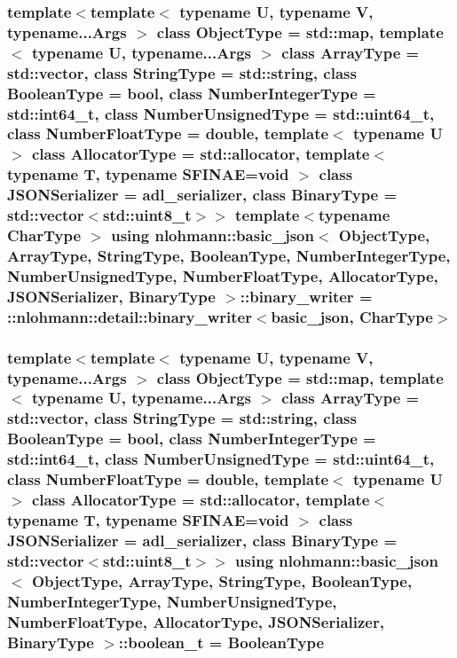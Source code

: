 \subsubsection[{\texorpdfstring{binary\+\_\+writer}{binary_writer}}]{\setlength{\rightskip}{0pt plus 5cm}template$<$template$<$ typename U, typename V, typename...\+Args $>$ class Object\+Type = std\+::map, template$<$ typename U, typename...\+Args $>$ class Array\+Type = std\+::vector, class String\+Type  = std\+::string, class Boolean\+Type  = bool, class Number\+Integer\+Type  = std\+::int64\+\_\+t, class Number\+Unsigned\+Type  = std\+::uint64\+\_\+t, class Number\+Float\+Type  = double, template$<$ typename U $>$ class Allocator\+Type = std\+::allocator, template$<$ typename T, typename S\+F\+I\+N\+A\+E=void $>$ class J\+S\+O\+N\+Serializer = adl\+\_\+serializer, class Binary\+Type  = std\+::vector$<$std\+::uint8\+\_\+t$>$$>$ template$<$typename Char\+Type $>$ using {\bf nlohmann\+::basic\+\_\+json}$<$ Object\+Type, Array\+Type, String\+Type, Boolean\+Type, Number\+Integer\+Type, Number\+Unsigned\+Type, Number\+Float\+Type, Allocator\+Type, J\+S\+O\+N\+Serializer, Binary\+Type $>$\+::{\bf binary\+\_\+writer} =  \+::{\bf nlohmann\+::detail\+::binary\+\_\+writer}$<${\bf basic\+\_\+json}, Char\+Type$>$\hspace{0.3cm}{\ttfamily [private]}}\hypertarget{classnlohmann_1_1basic__json_ab483f21649bd170f593ec58044cd68a6}{}\label{classnlohmann_1_1basic__json_ab483f21649bd170f593ec58044cd68a6}
\subsubsection[{\texorpdfstring{boolean\+\_\+t}{boolean_t}}]{\setlength{\rightskip}{0pt plus 5cm}template$<$template$<$ typename U, typename V, typename...\+Args $>$ class Object\+Type = std\+::map, template$<$ typename U, typename...\+Args $>$ class Array\+Type = std\+::vector, class String\+Type  = std\+::string, class Boolean\+Type  = bool, class Number\+Integer\+Type  = std\+::int64\+\_\+t, class Number\+Unsigned\+Type  = std\+::uint64\+\_\+t, class Number\+Float\+Type  = double, template$<$ typename U $>$ class Allocator\+Type = std\+::allocator, template$<$ typename T, typename S\+F\+I\+N\+A\+E=void $>$ class J\+S\+O\+N\+Serializer = adl\+\_\+serializer, class Binary\+Type  = std\+::vector$<$std\+::uint8\+\_\+t$>$$>$ using {\bf nlohmann\+::basic\+\_\+json}$<$ Object\+Type, Array\+Type, String\+Type, Boolean\+Type, Number\+Integer\+Type, Number\+Unsigned\+Type, Number\+Float\+Type, Allocator\+Type, J\+S\+O\+N\+Serializer, Binary\+Type $>$\+::{\bf boolean\+\_\+t} =  Boolean\+Type}\hypertarget{classnlohmann_1_1basic__json_a44fd1a12c9c54623c942b430e7a72937}{}\label{classnlohmann_1_1basic__json_a44fd1a12c9c54623c942b430e7a72937}


